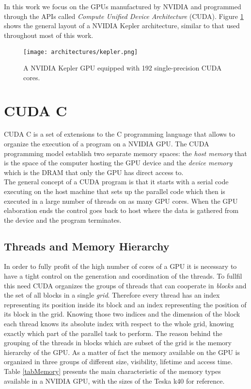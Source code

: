In this work we focus on the GPUs manufactured by NVIDIA and programmed through the APIs called \textit{Compute Unified Device Architecture} (CUDA).
Figure \ref{kepler} shows the general layout of a NVIDIA Kepler architecture, similar to that used throughout most of this work.

\begin{figure}
\centerline{\texttt{[image: architectures/kepler.png]}}
\caption{A NVIDIA Kepler GPU equipped with 192 single-precision CUDA cores.}
\label{kepler}
\end{figure}

\section{CUDA C}
CUDA C is a set of extensions to the C programming language that allows to organize the execution of a program on a NVIDIA GPU.
The CUDA programming model establish two separate memory spaces: the \textit{host memory} that is the space of the computer hosting the GPU device and the \textit{device memory} which is the DRAM that only the GPU has direct access to.\\
The general concept of a CUDA program is that it starts with a serial code executing on the host machine that sets up the parallel code which then is executed in a large number of threads on as many GPU cores. When the GPU elaboration ends the control goes back to host where the data is gathered from the device and the program terminates.

\subsection{Threads and Memory Hierarchy} 
In order to fully profit of the high number of cores of a GPU it is necessary to have a tight control on the generation and coordination of the threads.
To fullfil this need CUDA organizes the groups of threads that can cooperate in \textit{blocks} and the set of all blocks in a single \textit{grid}.
Therefore every thread has an index representing its position inside its block and an index representing the position of its block in the grid.
Knowing those two indices and the dimension of the block each thread knows its absolute index with respect to the whole grid, knowing exactly which part of the parallel task to perform.
The reason behind the grouping of the threads in blocks which are subset of the grid is the memory hierarchy of the GPU. As a matter of fact the memory available on the GPU is organized in three groups of different size, visibility, lifetime and access time. Table \ref{tabMemory} presents the main characteristic of the memory types available in a NVIDIA GPU, with the sizes of the Teska k40 for reference.

